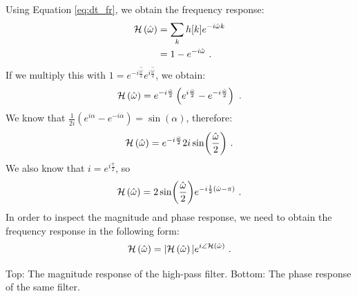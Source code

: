 Using Equation \ref{eq:dt_fr}, we obtain the frequency response:
\begin{align}
\mathcal{H}\left(\hat{\omega}\right) & = \sum_k h[k] e^{-i\hat{\omega}k}\\
    & = 1 -  e^{-i\hat{\omega}} \,\,.
\end{align}
If we multiply this with $1=e^{-i\frac{\hat{\omega}}{2}}e^{i\frac{\hat{\omega}}{2}}$, we obtain:
\begin{equation}
\mathcal{H}\left(\hat{\omega}\right) = e^{-i\frac{\hat{\omega}}{2}}\left(e^{i\frac{\hat{\omega}}{2}}-e^{-i\frac{\hat{\omega}}{2}}\right) \,\,.
\end{equation}
We know that $\frac{1}{2i}(e^{i\alpha} - e^{-i\alpha}) = \sin(\alpha)$, therefore:
\begin{equation}
\mathcal{H}\left(\hat{\omega}\right) = e^{-i\frac{\hat{\omega}}{2}} 2i \sin(\frac{\hat{\omega}}{2}) \,\,.
\end{equation}
We also know that $i=e^{i\frac{\pi}{2}}$, so 
\begin{equation}
\mathcal{H}\left(\hat{\omega}\right) = 2\sin(\frac{\hat{\omega}}{2}) e^{-i\frac{1}{2}(\hat{\omega}-\pi)} \,\,.
\end{equation}
In order to inspect the magnitude and phase response, we need to
obtain the frequency response in the following form:
\begin{equation}
\mathcal{H}\left(\hat{\omega}\right) =|\mathcal{H}\left(\hat{\omega}\right) |e^{i\angle \mathcal{H}\left(\hat{\omega}\right)} \,\,.
\end{equation} 

\begin{marginfigure}
\begin{center}

\end{center}
\caption{Top: The magnitude response of the high-pass filter. Bottom: The phase response of the same filter.}
\label{fig:hp_filter_ex}
\end{marginfigure}

